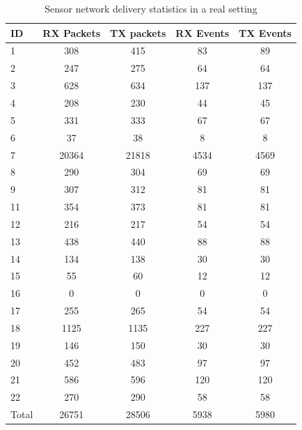 \begin{table}
  \centering
  \begin{tabular}{lcccc}
  \hline
  ID & RX Packets & TX packets & RX Events & TX Events \\
  \hline
﻿1&      308     &    415    &      83     &     89\\
  2&       247    &     275   &       64    &      64\\
  3&       628    &     634   &      137    &     137\\
  4&       208    &     230   &       44    &      45\\
  5&       331    &     333   &       67    &      67\\
  6&        37    &      38   &        8    &       8\\
  7&     20364    &   21818   &     4534    &    4569\\
  8&       290    &     304   &       69    &      69\\
  9&       307    &     312   &       81    &      81\\
  11&       354   &      373   &       81    &      81\\
  12&       216   &      217  &        54    &      54\\
  13&       438   &      440  &        88    &      88\\
  14&       134   &      138  &        30    &      30\\
  15&        55   &       60  &        12    &      12\\
  16&         0   &        0  &         0    &       0\\
  17&       255   &      265  &        54    &      54\\
  18&      1125   &    1135   &      227     &    227\\
  19&       146   &      150  &        30    &      30\\
  20&       452   &     483   &       97     &     97\\
  21&       586   &     596   &      120     &    120\\
  22&       270   &      290  &        58    &      58 \\ 
  \hline
  Total&    ﻿26751   &    28506   &     5938    &    5980 \\ 
  \hline
  \end{tabular}
  \caption{Sensor network delivery statistics in a real setting}
  \label{tab:recvstat}
\end{table}
